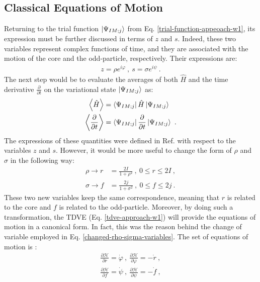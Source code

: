 \subsection{Classical Equations of Motion}
\label{equations-of-motion-section}

Returning to the trial function $\ket{\Psi_{IM;j}}$ from Eq. \ref{trial-function-appeoach-w1}, its expression must be further discussed in terms of $z$ and $s$. Indeed, these two variables represent complex functions of time, and they are associated with the motion of the core and the odd-particle, respectively. Their expressions are:
\begin{align}
    z=\rho e^{i\varphi}\ ,\ s=\sigma e^{i\psi}\ .
    \label{z-s-variables}
\end{align}
The next step would be to evaluate the averages of both $\hat{H}$ and the time derivative $\frac{\partial}{\partial t}$ on the variational state $\ket{\Psi_{IM;j}}$ as:
\begin{align}
    \left\langle \hat{H} \right\rangle&=\bra{\Psi_{IM;j}}\hat{H}\ket{\Psi_{IM;j}}\nonumber\\
    \left\langle \frac{\partial}{\partial t} \right\rangle&=\bra{\Psi_{IM;j}}\frac{\partial}{\partial t}\ket{\Psi_{IM;j}}\ .
    \label{hamiltonian-average}
\end{align}
The expressions of these quantities were defined in Ref. \cite{raduta2017semiclassical} with respect to the variables $z$ and $s$. However, it would be more useful to change the form of $\rho$ and $\sigma$ in the following way:
\begin{align}
    \rho \to r&=\frac{2I}{1+\rho^2}\ ,\ 0\leq r\leq 2I\ ,\nonumber\\
    \sigma \to f&=\frac{2j}{1+\sigma^2}\ ,\ 0\leq f\leq 2j\ .
    \label{changed-rho-sigma-variables}
\end{align}
These two new variables keep the same correspondence, meaning that $r$ is related to the core and $f$ is related to the odd-particle. Moreover, by doing such a transformation, the TDVE (Eq. \ref{tdve-approach-w1}) will provide the equations of motion in a canonical form. In fact, this was the reason behind the change of variable employed in Eq. \ref{changed-rho-sigma-variables}. The set of equations of motion is \cite{raduta2020approach}:
\begin{align}
    \frac{\partial \mathcal{H}}{\partial r}=\dot{\varphi}\ ,\ \frac{\partial \mathcal{H}}{\partial \varphi}=-\dot{r}\ ,\nonumber\\
    \frac{\partial \mathcal{H}}{\partial f}=\dot{\psi}\ ,\ \frac{\partial \mathcal{H}}{\partial \psi}=-\dot{f}\ ,
    \label{eq-of-motion-approach-w1}
\end{align}
